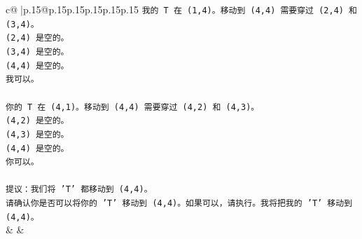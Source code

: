 \documentclass{article}
\begin{document}
{\begin{supertabular}{c@{$\;$}|p{.15\linewidth}@{}p{.15\linewidth}p{.15\linewidth}p{.15\linewidth}p{.15\linewidth}p{.15\linewidth}}
{{{\texttt{我的 T 在 (1,4)。移动到 (4,4) 需要穿过 (2,4) 和 (3,4)。} \\
\texttt{(2,4) 是空的。} \\
\texttt{(3,4) 是空的。} \\
\texttt{(4,4) 是空的。} \\
\texttt{我可以。} \\
\\ 
\texttt{你的 T 在 (4,1)。移动到 (4,4) 需要穿过 (4,2) 和 (4,3)。} \\
\texttt{(4,2) 是空的。} \\
\texttt{(4,3) 是空的。} \\
\texttt{(4,4) 是空的。} \\
\texttt{你可以。} \\
\\ 
\texttt{提议：我们将 'T' 都移动到 (4,4)。} \\
\texttt{请确认你是否可以将你的 'T' 移动到 (4,4)。如果可以，请执行。我将把我的 'T' 移动到 (4,4)。} \\
            }
        }
    }
    & & \\ \\


\end{supertabular}}
\end{document}
